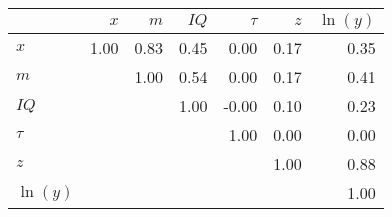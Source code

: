 \begin{tabular}{lrrrrrr}
\hline
 & $x$  & $m$  & $IQ$  & $\tau$  & $z$  & $\ln(y)$  \\ 
\hline
$x$ & 1.00  & 0.83  & 0.45  & 0.00  & 0.17  & 0.35  \\ 
$m$ &   & 1.00  & 0.54  & 0.00  & 0.17  & 0.41  \\ 
$IQ$ &   &   & 1.00  & -0.00  & 0.10  & 0.23  \\ 
$\tau$ &   &   &   & 1.00  & 0.00  & 0.00  \\ 
$z$ &   &   &   &   & 1.00  & 0.88  \\ 
$\ln(y)$ &   &   &   &   &   & 1.00  \\ 
\hline
\end{tabular}%
